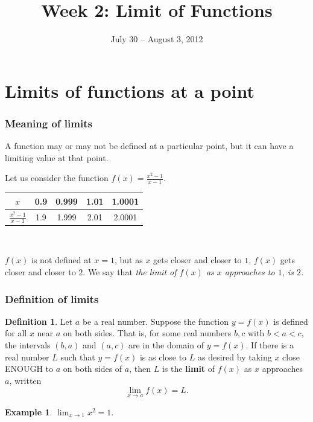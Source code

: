 \documentclass[t]{beamer}
\title{Week 2:  Limit of Functions}
\date{July 30 -- August 3, 2012}
\theoremstyle{plain}
\theoremstyle{definition}
\newtheorem{dfn}{Definition}
\newtheorem{ex}{Example}[section]
\newcommand{\ds}{\displaystyle}
\begin{document}
\frame{\titlepage}

\setcounter{tocdepth}{2}


\section{Limits of functions at a point}
\frame
{
  \frametitle{Meaning of  limits}
  A function may or may not be defined at a particular point, but it can have a limiting value at that point.
  \pause
  
  Let us consider the function $f(x)= \ds{\frac{x^2-1}{x-1}}$.\\[3mm] \pause
  
  \begin{tabular}{|c|c|c|c|c|}\hline
  $x$ & 0.9 & 0.999 & 1.01 & 1.0001  \\ \hline
  $\ds{\frac{x^2-1}{x-1}}$ & 1.9 & 1.999 & 2.01 & 2.0001 \\ \hline
  \end{tabular}\\[3mm] \pause
  
  $f(x)$ is not defined at $x=1$, but as $x$ gets closer and closer to $1$, $f(x)$ gets closer and closer to $2$. \pause
  We say that {\em the limit of $f(x)$ as $x$ approaches to $1$, is $2$.}
  }
  
\frame
{
  \frametitle{Definition of  limits}
\begin{dfn}
Let $a$ be a real number. Suppose the function
$y=f(x)$ is defined for all $x$ near $a$ on both sides. That is, for some real numbers $b,c$ with $b<a<c$,   the intervals $(b,a)$ and $(a,c)$ are in the domain of $y=f(x)$. 
\pause
If there is a real number $L$ such that $y=f(x)$ is as close  to $L$ as desired
 by taking $x$ close ENOUGH to $a$ on both sides of $a$, then $L$ is
the {\bf limit} of $f(x)$ as $x$ approaches $a$, written
\[
\lim_{x\to a} f(x) = L.
\]
\end{dfn}
\pause
\begin{ex}
$\lim_{x\to 1}x^2 =1$.
\end{ex}
}
\end{document}
